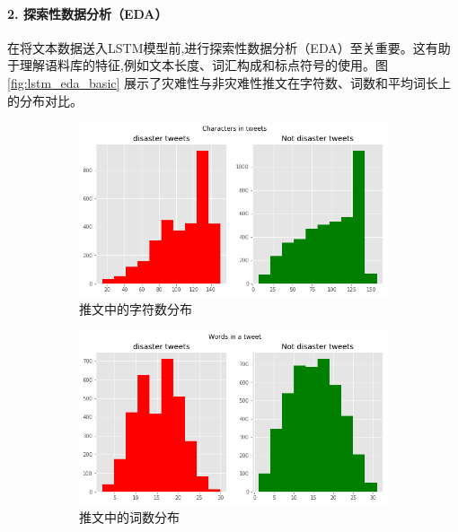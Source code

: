 \paragraph{2. 探索性数据分析（EDA）}
在将文本数据送入LSTM模型前,进行探索性数据分析（EDA）至关重要。这有助于理解语料库的特征,例如文本长度、词汇构成和标点符号的使用。图 \ref{fig:lstm_eda_basic} 展示了灾难性与非灾难性推文在字符数、词数和平均词长上的分布对比。
\begin{figure}[htbp]
    \centering
    \begin{subfigure}[b]{0.48\textwidth}
        \centering
        \includegraphics[width=\textwidth]{figures/LSTM2.png}
        \caption{推文中的字符数分布}
        \label{fig:char_dist}
    \end{subfigure}
    \hfill
    \begin{subfigure}[b]{0.48\textwidth}
        \centering
        \includegraphics[width=\textwidth]{figures/LSTM3.png}
        \caption{推文中的词数分布}
        \label{fig:word_dist}
    \end{subfigure}
    \vspace{1cm}
    \begin{subfigure}[b]{0.48\textwidth}

\end{subfigure}
\end{figure}
